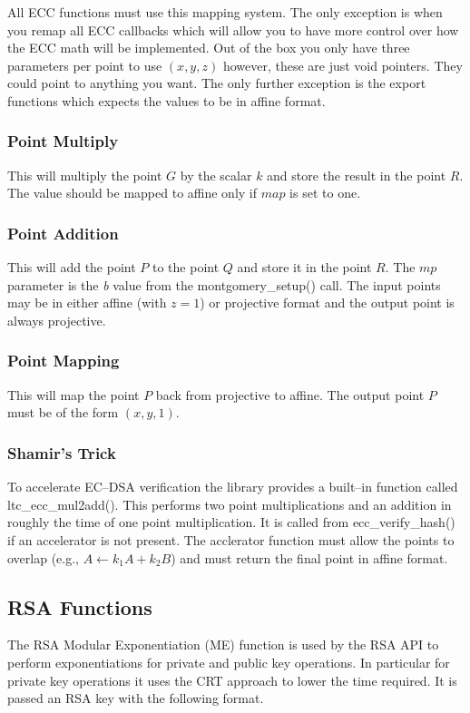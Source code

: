 \documentclass[synpaper]{book}
\begin{document}
All ECC functions must use this mapping system.  The only exception is when you remap all ECC callbacks which will allow you to have more control
over how the ECC math will be implemented.  Out of the box you only have three parameters per point to use $(x, y, z)$ however, these are just void pointers.  They
could point to anything you want.  The only further exception is the export functions which expects the values to be in affine format.

\subsubsection{Point Multiply}
This will multiply the point $G$ by the scalar $k$ and store the result in the point $R$.  The value should be mapped to affine only if $map$ is set to one.  

\subsubsection{Point Addition}
This will add the point $P$ to the point $Q$ and store it in the point $R$.  The $mp$ parameter is the \textit{b} value from the montgomery\_setup() call.  The input points
may be in either affine (with $z = 1$) or projective format and the output point is always projective.  

\subsubsection{Point Mapping}
This will map the point $P$ back from projective to affine.  The output point $P$ must be of the form $(x, y, 1)$.  

\subsubsection{Shamir's Trick}
To accelerate EC--DSA verification the library provides a built--in function called ltc\_ecc\_mul2add().  This performs two point multiplications and an addition in
roughly the time of one point multiplication.  It is called from ecc\_verify\_hash() if an accelerator is not present.  The acclerator function must allow the points to
overlap (e.g., $A \leftarrow k_1A + k_2B$) and must return the final point in affine format.  


\subsection{RSA Functions}
The RSA Modular Exponentiation (ME) function is used by the RSA API to perform exponentiations for private and public key operations.  In particular for
private key operations it uses the CRT approach to lower the time required.  It is passed an RSA key with the following format.
\end{document}
